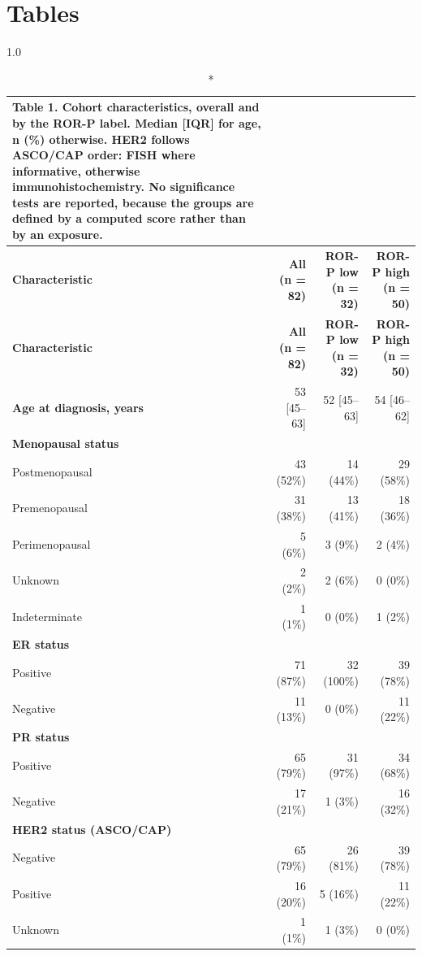 \documentclass[11pt,a4paper]{article}
\begin{document}
\section*{Tables}
\begin{spacing}{1.0}
\small
\begin{longtable}{@{}p{}rrr@{}}
\caption*{\textbf{Table 1.} Cohort characteristics, overall and by the ROR-P label. Median [IQR] for age, n (\%) otherwise. HER2 follows ASCO/CAP order: FISH where informative, otherwise immunohistochemistry. No significance tests are reported, because the groups are defined by a computed score rather than by an exposure.}\\
\toprule
\textbf{Characteristic} & \textbf{All (n = 82)} & \textbf{ROR-P low (n = 32)} & \textbf{ROR-P high (n = 50)} \\
\midrule\endfirsthead
\toprule
\textbf{Characteristic} & \textbf{All (n = 82)} & \textbf{ROR-P low (n = 32)} & \textbf{ROR-P high (n = 50)} \\
\midrule\endhead
\textbf{Age at diagnosis, years} & 53 [45--63] & 52 [45--63] & 54 [46--62] \\
\textbf{Menopausal status} &  &  &  \\
\quad Postmenopausal & 43 (52\%) & 14 (44\%) & 29 (58\%) \\
\quad Premenopausal & 31 (38\%) & 13 (41\%) & 18 (36\%) \\
\quad Perimenopausal & 5 (6\%) & 3 (9\%) & 2 (4\%) \\
\quad Unknown & 2 (2\%) & 2 (6\%) & 0 (0\%) \\
\quad Indeterminate & 1 (1\%) & 0 (0\%) & 1 (2\%) \\
\textbf{ER status} &  &  &  \\
\quad Positive & 71 (87\%) & 32 (100\%) & 39 (78\%) \\
\quad Negative & 11 (13\%) & 0 (0\%) & 11 (22\%) \\
\textbf{PR status} &  &  &  \\
\quad Positive & 65 (79\%) & 31 (97\%) & 34 (68\%) \\
\quad Negative & 17 (21\%) & 1 (3\%) & 16 (32\%) \\
\textbf{HER2 status (ASCO/CAP)} &  &  &  \\
\quad Negative & 65 (79\%) & 26 (81\%) & 39 (78\%) \\
\quad Positive & 16 (20\%) & 5 (16\%) & 11 (22\%) \\
\quad Unknown & 1 (1\%) & 1 (3\%) & 0 (0\%) \\

\end{longtable}
\end{spacing}
\end{document}
